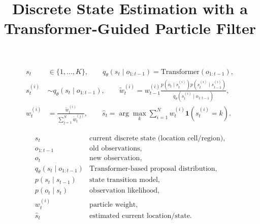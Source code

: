 \documentclass[a4paper]{article}
\title{Discrete State Estimation with a Transformer-Guided Particle Filter}
\date{}
\begin{document}
    \maketitle
    \cite{chopin-2001-sequential-inference-and-state-number-determination-for-discrete-state-space-models-through-particle-filtering}
    \[
        \begin{aligned}
            s_t
            &\in
            \{1,\ldots,K\},
            \qquad
            q_{\theta}(s_t \mid o_{1:t-1})
            =
            \mathrm{Transformer}(o_{1:t-1}),
            \\[4pt]
            s_t^{(i)}
            &\sim
            q_{\theta}(s_t \mid o_{1:t-1}),
            \qquad
            \tilde{w}_t^{(i)}
            =
            w_{t-1}^{(i)}
            \frac{
                p(o_t \mid s_t^{(i)})
                p(s_t^{(i)} \mid s_{t-1}^{(i)})
            }{
                q_{\theta}(s_t^{(i)} \mid o_{1:t-1})
            },
            \\[4pt]
            w_t^{(i)}
            &=
            \frac{
                \tilde{w}_t^{(i)}
            }{
                \sum_{j=1}^{N}\tilde{w}_t^{(j)}
            },
            \qquad
            \hat{s}_t
            =
            \arg\max_{k}
            \sum_{i=1}^{N}
            w_t^{(i)}
            \mathbf{1}
            \left(
                s_t^{(i)}=k
            \right).
        \end{aligned}
    \]
    
    \[
        \begin{array}{ll}
            s_t & \text{current discrete state (location cell/region)}, \\
            o_{1:t-1} & \text{old observations}, \\
            o_t & \text{new observation}, \\
            q_{\theta}(s_t \mid o_{1:t-1}) & \text{Transformer-based proposal distribution}, \\
            p(s_t \mid s_{t-1}) & \text{state transition model}, \\
            p(o_t \mid s_t) & \text{observation likelihood}, \\
            w_t^{(i)} & \text{particle weight}, \\
            \hat{s}_t & \text{estimated current location/state}.
        \end{array}
    \]
%    
%    
\end{document}
